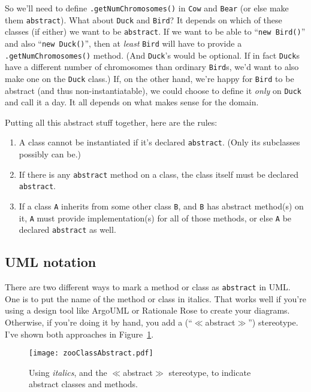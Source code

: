 So we'll need to define \texttt{.getNumChromosomes()} in \texttt{Cow} and
\texttt{Bear} (or else make them \texttt{abstract}). What about \texttt{Duck}
and \texttt{Bird}? It depends on which of these classes (if either) we want to
be \texttt{abstract}. If we want to be able to ``\texttt{new Bird()}'' and also
``\texttt{new Duck()}'', then at \textit{least} \texttt{Bird} will have to
provide a \texttt{.getNumChromosomes()} method. (And \texttt{Duck}'s would be
optional. If in fact \texttt{Duck}s have a different number of chromosomes
than ordinary \texttt{Bird}s, we'd want to also make one on the \texttt{Duck}
class.) If, on the other hand, we're happy for \texttt{Bird} to be abstract
(and thus non-instantiatable), we could choose to define it \textit{only} on
\texttt{Duck} and call it a day. It all depends on what makes sense for the
domain.

Putting all this abstract stuff together, here are the rules:

\begin{enumerate}
\itemsep.1em
\item A class cannot be instantiated if it's declared \texttt{abstract}. (Only
its subclasses possibly can be.)
\item If there is any \texttt{abstract} method on a class, the class itself
must be declared \texttt{abstract}.
\item If a class \texttt{A} inherits from some other class \texttt{B}, and
\texttt{B} has abstract method(s) on it, \texttt{A} must provide
implementation(s) for all of those methods, or else \texttt{A} be declared 
\texttt{abstract} as well.
\end{enumerate}

\subsection{UML notation}

There are two different ways to mark a method or class as \texttt{abstract} in
UML. One is to put the name of the method or class in italics. That works well
if you're using a design tool like ArgoUML or Rationale Rose to create your
diagrams. Otherwise, if you're doing it by hand, you add a
(``$\ll$abstract$\gg$'') stereotype. I've shown both approaches in
Figure~\ref{fig:zooClassAbstract}.

\begin{figure}
\centering
\texttt{[image: zooClassAbstract.pdf]}
\caption{Using \textit{italics}, and the $\ll$abstract$\gg$ stereotype, to
indicate abstract classes and methods.}
\label{fig:zooClassAbstract}
\end{figure}

